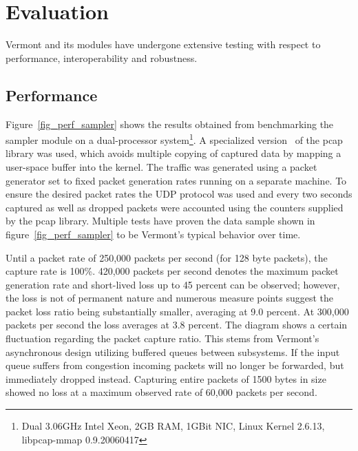 \section{Evaluation}
\label{sec:evaluation}

Vermont and its modules have undergone extensive testing with respect to performance, interoperability and robustness.

\subsection{Performance}

Figure~\ref{fig_perf_sampler} shows the results obtained from benchmarking the sampler module on a dual-processor system\footnote{Dual 3.06GHz Intel Xeon, 2GB RAM, 1GBit NIC, Linux Kernel 2.6.13, libpcap-mmap 0.9.20060417}.
A specialized version~\cite{pcap-mmap} of the pcap library was used, which avoids multiple copying of captured data by mapping a user-space buffer into the kernel.
The traffic was generated using a packet generator set to fixed packet generation rates running on a separate machine. To ensure the desired packet rates the UDP protocol was used 
and every two seconds captured as well as dropped packets were accounted using the counters supplied by the pcap library. Multiple tests have proven the data sample shown in figure~\ref{fig_perf_sampler} to be Vermont's typical behavior over time.

Until a packet rate of 250,000 packets per second (for 128 byte packets), the capture rate is 100\%.
420,000 packets per second denotes the maximum packet generation rate and short-lived loss up to 45 percent can be observed; however, the loss is not of permanent nature and numerous measure points suggest the packet loss ratio being substantially smaller, averaging at 9.0 percent. At 300,000 packets per second the loss averages at 3.8 percent.
The diagram shows a certain fluctuation regarding the packet capture ratio. This stems from Vermont's asynchronous design utilizing buffered queues between subsystems. If the input queue suffers from congestion incoming packets will no longer be forwarded, but immediately dropped instead.
Capturing entire packets of 1500 bytes in size showed no loss at a maximum observed rate of 60,000 packets per second.

